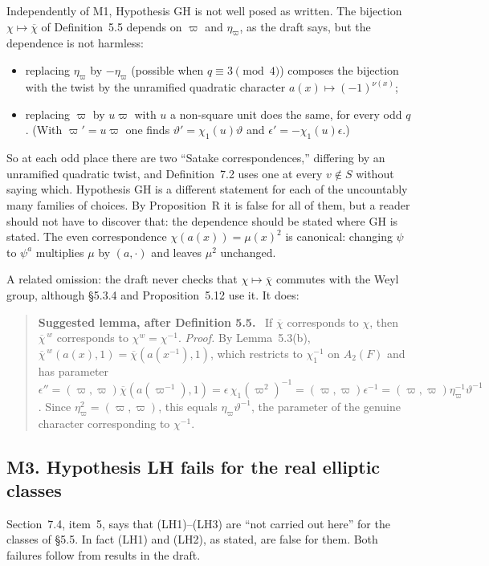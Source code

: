 \documentclass[12pt,letterpaper]{article}
\newcommand{\ov}[1]{\overline{#1}}
\theoremstyle{plain}
\newenvironment{fix}[1][Suggested text]%
  {\begin{quote}\small\noindent\textbf{#1.}\ }%
  {\end{quote}}
\begin{document}
Independently of M1, Hypothesis GH is not well posed as written. The
bijection $\chi\mapsto\ov\chi$ of Definition~5.5 depends on $\varpi$ and
$\eta_\varpi$, as the draft says, but the dependence is not harmless:
\begin{itemize}
\item replacing $\eta_\varpi$ by $-\eta_\varpi$ (possible when
$q\equiv3\pmod4$) composes the bijection with the twist by the unramified
quadratic character $a(x)\mapsto(-1)^{\nu(x)}$;
\item replacing $\varpi$ by $u\varpi$ with $u$ a non-square unit does the
same, for every odd $q$. (With $\varpi'=u\varpi$ one finds
$\vartheta'=\chi_1(u)\vartheta$ and $\epsilon'=-\chi_1(u)\epsilon$.)
\end{itemize}
So at each odd place there are two ``Satake correspondences,'' differing by
an unramified quadratic twist, and Definition~7.2 uses one at every
$v\notin S$ without saying which. Hypothesis GH is a different statement
for each of the uncountably many families of choices. By Proposition~R it
is false for all of them, but a reader should not have to discover that:
the dependence should be stated where GH is stated. The even
correspondence $\chi(a(x))=\mu(x)^2$ is canonical: changing $\psi$ to
$\psi^a$ multiplies $\mu$ by $(a,\cdot)$ and leaves $\mu^2$ unchanged.

A related omission: the draft never checks that
$\chi\mapsto\ov\chi$ commutes with the Weyl group, although \S5.3.4 and
Proposition~5.12 use it. It does:

\begin{fix}[Suggested lemma, after Definition 5.5]
If $\ov\chi$ corresponds to $\chi$, then $\ov\chi^{\,w}$ corresponds to
$\chi^w=\chi^{-1}$. \emph{Proof.} By Lemma~5.3(b),
$\ov\chi^{\,w}(a(x),1)=\ov\chi(a(x^{-1}),1)$, which restricts to
$\chi_1^{-1}$ on $A_2(F)$ and has parameter
$\epsilon''=(\varpi,\varpi)\ov\chi(a(\varpi^{-1}),1)
=\epsilon\,\chi_1(\varpi^2)^{-1}=(\varpi,\varpi)\epsilon^{-1}
=(\varpi,\varpi)\eta_\varpi^{-1}\vartheta^{-1}$. Since
$\eta_\varpi^2=(\varpi,\varpi)$, this equals $\eta_\varpi\vartheta^{-1}$,
the parameter of the genuine character corresponding to $\chi^{-1}$.
\end{fix}

\subsection*{M3. Hypothesis LH fails for the real elliptic classes}

Section~7.4, item~5, says that (LH1)--(LH3) are ``not carried out here''
for the classes of \S5.5. In fact (LH1) and (LH2), as stated, are false for
them. Both failures follow from results in the draft.
\end{document}
